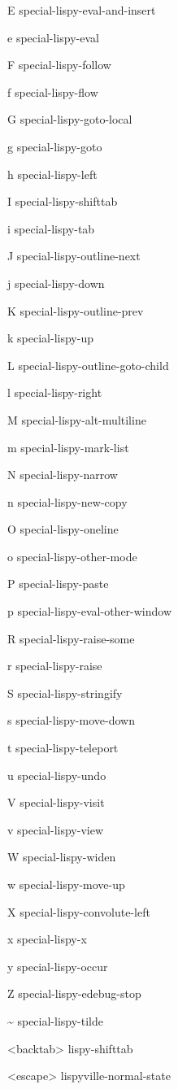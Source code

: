 \documentclass[a4paper,10pt]{article}
\newcommand\keyify[1]{\keys{\ttfamily#1}}
\begin{document}
\begin{multicols*}{3}
\begin{keylist}[labelwidth=\widthof{\keyify{<backtab>}}]
	\item[E] special-lispy-eval-and-insert
	\item[e] special-lispy-eval
	\item[F] special-lispy-follow
	\item[f] special-lispy-flow
	\item[G] special-lispy-goto-local
	\item[g] special-lispy-goto
	\item[h] special-lispy-left
	\item[I] special-lispy-shifttab
	\item[i] special-lispy-tab
	\item[J] special-lispy-outline-next
	\item[j] special-lispy-down
	\item[K] special-lispy-outline-prev
	\item[k] special-lispy-up
	\item[L] special-lispy-outline-goto-child
	\item[l] special-lispy-right
	\item[M] special-lispy-alt-multiline
	\item[m] special-lispy-mark-list
	\item[N] special-lispy-narrow
	\item[n] special-lispy-new-copy
	\item[O] special-lispy-oneline
	\item[o] special-lispy-other-mode
	\item[P] special-lispy-paste
	\item[p] special-lispy-eval-other-window
	\item[R] special-lispy-raise-some
	\item[r] special-lispy-raise
	\item[S] special-lispy-stringify
	\item[s] special-lispy-move-down
	\item[t] special-lispy-teleport
	\item[u] special-lispy-undo
	\item[V] special-lispy-visit
	\item[v] special-lispy-view
	\item[W] special-lispy-widen
	\item[w] special-lispy-move-up
	\item[X] special-lispy-convolute-left
	\item[x] special-lispy-x
	\item[y] special-lispy-occur
	\item[Z] special-lispy-edebug-stop
	\item[\textasciitilde] special-lispy-tilde
	\item[<backtab>] lispy-shifttab
	\item[<escape>] lispyville-normal-state
\end{keylist}



\end{multicols*}
\end{document}

